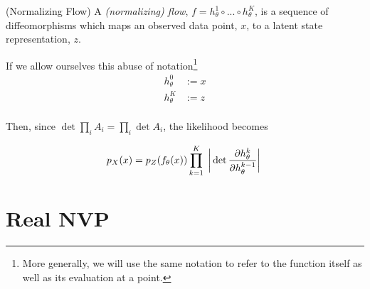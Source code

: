 \documentclass[10pt]{beamer}
\begin{document}
\begin{frame}
\begin{definition}{(Normalizing Flow)} \label{flow}
A \textit{(normalizing) flow}, $f=h_\theta^1 \circ ... \circ h_\theta^K$, is a sequence of diffeomorphisms which maps an observed data point, $x$, to a latent state representation, $z$. 
\end{definition}

If we allow ourselves this abuse of notation\footnote{More generally, we will use the same notation to refer to the function itself as well as its evaluation at a point.}
\begin{align*}
h_\theta^0 &:=x \\
h_\theta^K &:= z \\
\end{align*}

Then, since $\det \prod_i A_i = \prod_i \det A_i$, the likelihood becomes 

\begin{equation} 
\label{cov}
p_X(x) = p_Z( f_\theta(x) ) \displaystyle\prod_{k=1}^K\; \bigg\lvert \det{\displaystyle\frac{\partial h_\theta^k}{\partial h_\theta^{k-1}}} \bigg\rvert \;  
\end{equation}
\end{frame}

%
%



\section{Real NVP}
\end{document}
